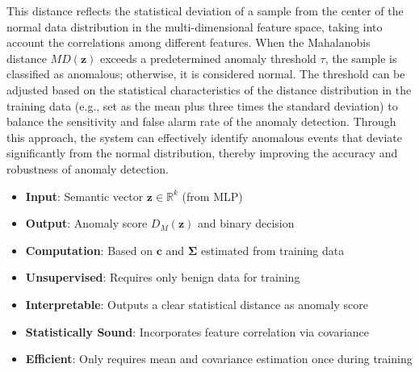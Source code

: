 \begin{ZhChapter}
    This distance reflects the statistical deviation of a sample from the center of the normal data distribution in the multi-dimensional feature space, taking into account the correlations among different features. When the Mahalanobis distance $MD(\mathbf{z})$ exceeds a predetermined anomaly threshold $\tau$, the sample is classified as anomalous; otherwise, it is considered normal. The threshold can be adjusted based on the statistical characteristics of the distance distribution in the training data (e.g., set as the mean plus three times the standard deviation) to balance the sensitivity and false alarm rate of the anomaly detection. Through this approach, the system can effectively identify anomalous events that deviate significantly from the normal distribution, thereby improving the accuracy and robustness of anomaly detection.


    \begin{itemize}
        \item \textbf{Input}: Semantic vector $\mathbf{z} \in \mathbb{R}^k$ (from MLP)
        \item \textbf{Output}: Anomaly score $D_M(\mathbf{z})$ and binary decision
        \item \textbf{Computation}: Based on $\boldsymbol{c}$ and $\boldsymbol{\Sigma}$ estimated from training data
    \end{itemize}



    \begin{itemize}
        \item \textbf{Unsupervised}: Requires only benign data for training
        \item \textbf{Interpretable}: Outputs a clear statistical distance as anomaly score
        \item \textbf{Statistically Sound}: Incorporates feature correlation via covariance
        \item \textbf{Efficient}: Only requires mean and covariance estimation once during training
    \end{itemize}




\end{ZhChapter}